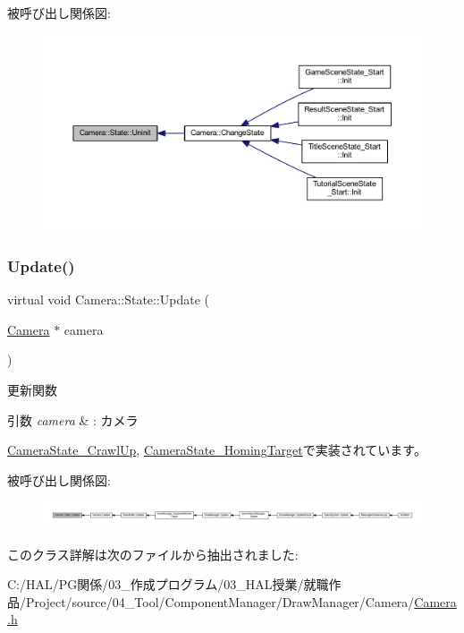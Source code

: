 被呼び出し関係図\+:
\nopagebreak
\begin{figure}[H]
\begin{center}
\leavevmode
\includegraphics[width=350pt]{class_camera_1_1_state_adb3f43b6c3f8100da7877867180e804b_icgraph}
\end{center}
\end{figure}
\mbox{\label{class_camera_1_1_state_a2d41e0cb783666bae6c6ea167fcc7874}} 
\subsubsection{\texorpdfstring{Update()}{Update()}}
{\footnotesize\ttfamily virtual void Camera\+::\+State\+::\+Update (\begin{DoxyParamCaption}\item[{\mbox{\hyperlink{class_camera}{Camera}} $\ast$}]{camera }\end{DoxyParamCaption})\hspace{0.3cm}{\ttfamily [pure virtual]}}



更新関数 


\begin{DoxyParams}{引数}
{\em camera} & \+: カメラ \\
\hline
\end{DoxyParams}


\mbox{\hyperlink{class_camera_state___crawl_up_aaebd2634f1677b7c00e6761ed91e1264}{Camera\+State\+\_\+\+Crawl\+Up}}, \mbox{\hyperlink{class_camera_state___homing_target_a98f04985c06033febdad32d6357088c9}{Camera\+State\+\_\+\+Homing\+Target}}で実装されています。

被呼び出し関係図\+:
\nopagebreak
\begin{figure}[H]
\begin{center}
\leavevmode
\includegraphics[width=350pt]{class_camera_1_1_state_a2d41e0cb783666bae6c6ea167fcc7874_icgraph}
\end{center}
\end{figure}


このクラス詳解は次のファイルから抽出されました\+:\begin{DoxyCompactItemize}
\item 
C\+:/\+H\+A\+L/\+P\+G関係/03\+\_\+作成プログラム/03\+\_\+\+H\+A\+L授業/就職作品/\+Project/source/04\+\_\+\+Tool/\+Component\+Manager/\+Draw\+Manager/\+Camera/\mbox{\hyperlink{_camera_8h}{Camera.\+h}}\end{DoxyCompactItemize}
